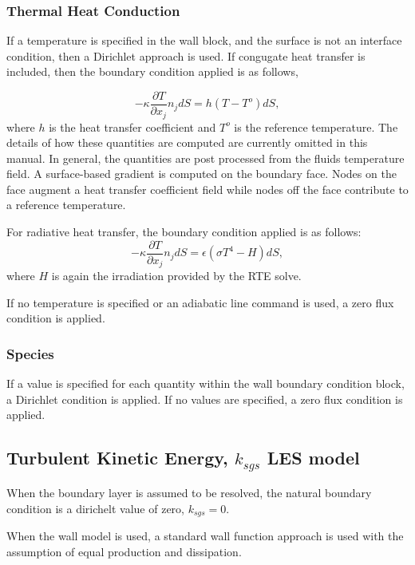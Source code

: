 \subsubsection{Thermal Heat Conduction}
If a temperature is specified in the wall block, and the surface is not an interface condition, then a Dirichlet
approach is used. If congugate heat transfer is included, then
the boundary condition applied is as follows,

\begin{equation}
     -\kappa \frac{\partial T} {\partial x_j} n_j dS = h(T-T^o)dS,
\end{equation}
where $h$ is the heat transfer coefficient and $T^o$ is the reference
temperature. The details of how these quantities are computed are currently omitted
in this manual. In general, the quantities are post processed from the fluids temperature field. A surface-based
gradient is computed on the boundary face. Nodes on the face augment a heat transfer coefficient field while
nodes off the face contribute to a reference temperature. 

For radiative heat transfer, the boundary condition 
applied is as follows:
\begin{equation}
     -\kappa \frac{\partial T} {\partial x_j} n_j dS = \epsilon (\sigma T^4 - H) dS,
\end{equation}
where $H$ is again the irradiation provided by the RTE solve.

If no temperature is specified or an adiabatic line command is used, a zero flux condition is applied.

\subsubsection{Species}
If a value is specified for each quantity within the wall boundary condition block, a Dirichlet condition
is applied. If no values are specified, a zero flux condition is applied.

\subsection{Turbulent Kinetic Energy, $k_{sgs}$ LES model}
When the boundary layer is assumed to be resolved, the natural boundary condition is a dirichelt value of zero, 
$k_{sgs} = 0$. 

When the wall model is used, a standard wall function approach is used with the assumption of equal production and
dissipation.

